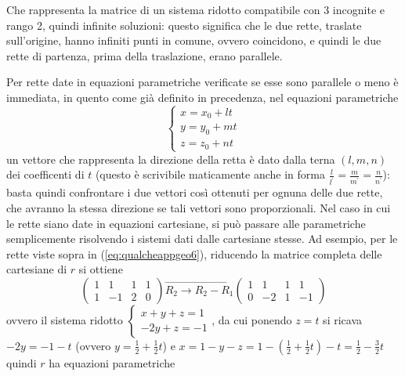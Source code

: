 Che rappresenta la matrice di un sistema ridotto compatibile con 3 incognite e rango 2, quindi infinite
soluzioni: questo significa che le due rette, traslate sull'origine, hanno infiniti punti in comune,
ovvero coincidono, e quindi le due rette di partenza, prima della traslazione, erano parallele.
\begin{oss}
  \label{oss:qualcheappgeo3}
Per rette date in equazioni parametriche verificate se esse sono parallele o meno è immediata, in quento
come già definito in precedenza, nel equazioni parametriche
\begin{equation*}
  \begin{cases}
    x=x_0+lt\\
    y=y_0+mt\\
    z=z_0+nt
  \end{cases}
\end{equation*}
un vettore che rappresenta la direzione della retta è dato dalla terna $(l,m,n)$ dei coefficenti di
$t$ (questo è scrivibile maticamente anche in forma $\frac{l}{l^\prime}=\frac{m}{m^\prime}=
\frac{n}{n^\prime}$): basta quindi confrontare i due vettori così ottenuti per ognuna delle due rette,
che avranno la stessa direzione se tali vettori sono proporzionali. Nel caso in cui le rette siano date
in equazioni cartesiane, si può passare alle parametriche semplicemente risolvendo i sistemi dati dalle
cartesiane stesse. Ad esempio, per le rette viste sopra in (\ref{eq:qualcheappgeo6}), riducendo la
matrice completa delle cartesiane di $r$ si ottiene
\begin{equation*}
  \left(
    \begin{array}{ccc|c}
      1 & 1 & 1 & 1 \\
      1 & -1 & 2 & 0
    \end{array}
  \right)\overrightarrow{R_2\to R_2-R_1}
\left(
  \begin{array}{ccc|c}
    1 & 1 & 1 & 1 \\
      0 & -2 & 1 & -1
  \end{array}
\right)
\end{equation*}
ovvero il sistema ridotto $
\begin{cases}
  x+y+z=1\\
  -2y+z=-1
\end{cases}
$, da cui ponendo $z=t$ si ricava $-2y=-1-t$ (ovvero $y=\frac{1}{2}+\frac{1}{2}t$) e $x=1-y-z=
1-\left(\frac{1}{2}+\frac{1}{2}t\right)-t=\frac{1}{2}-\frac{3}{2}t$ quindi $r$ ha equazioni parametriche
  \begin{equation}
    \label{eq:qualcheappgeo8}

\end{equation}
\end{oss}
